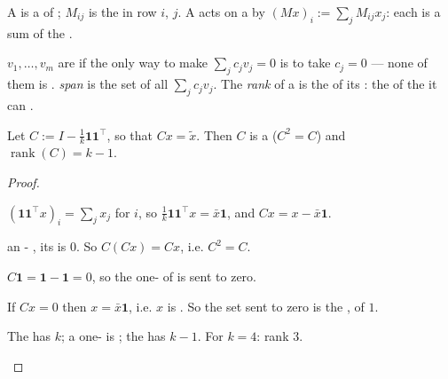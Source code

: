 A \emph{} is a   of ; $M_{ij}$ is the  in row
$i$,  $j$. A  acts on a  by
$(Mx)_i := \sum_j M_{ij}x_j$: each   is a  sum of the
 .

\begin{definition}
 $v_1,\dots,v_m$ are \emph{ } if the only way to make
$\sum_j c_j v_j = 0$ is to take  $c_j = 0$ --- none of them is . 
\emph{span} is the set of all $\sum_j c_j v_j$. The \emph{rank} of a  is the
 of     its : the  of the
 it can .
\end{definition}

\begin{lemma}
\label{lem:centrank}
Let $C := I - \tfrac1k\mathbf{1}\mathbf{1}^\top$, so that $Cx = \tilde x$. Then
$C$ is a  ($C^2=C$) and $\operatorname{rank}(C)=k-1$.
\end{lemma}
\begin{proof}
\begin{steps}
\item $(\mathbf{1}\mathbf{1}^\top x)_i = \sum_j x_j$
for  $i$, so $\tfrac1k \mathbf{1}\mathbf{1}^\top x = \bar x\mathbf{1}$, and
$Cx = x - \bar x \mathbf{1}$.
\item {} an -  
,  its  is $0$. So $C(Cx)=Cx$, i.e. $C^2=C$.
\item $C\mathbf{1} = \mathbf{1}-\mathbf{1}=0$, so the
one-  of   is sent to zero.
\item If $Cx=0$ then $x=\bar x\mathbf{1}$, i.e. $x$ is
. So the set sent to zero is \emph{} the , of 
$1$.
\item The   has  $k$; a one-
 is ; the   has  $k-1$. For $k=4$:
rank $3$.
\end{steps}
\end{proof}

